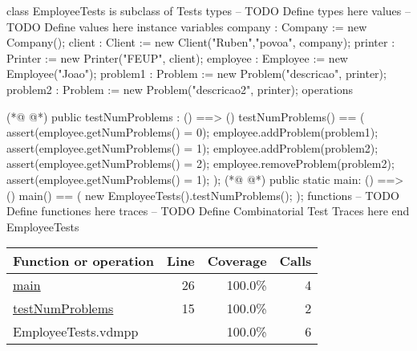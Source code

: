 \begin{vdmpp}[breaklines=true]
class EmployeeTests is subclass of Tests
types
-- TODO Define types here
values
-- TODO Define values here
instance variables
company : Company := new Company();
client : Client := new Client("Ruben","povoa", company);
printer : Printer := new Printer("FEUP", client);
employee : Employee := new Employee("Joao");
problem1 : Problem := new Problem("descricao", printer);
problem2 : Problem := new Problem("descricao2", printer);
operations

(*@
\label{testNumProblems:15}
@*)
public testNumProblems : () ==> ()
testNumProblems() ==
(
assert(employee.getNumProblems() = 0);
employee.addProblem(problem1);
assert(employee.getNumProblems() = 1);
employee.addProblem(problem2);
assert(employee.getNumProblems() = 2);
employee.removeProblem(problem2);
assert(employee.getNumProblems() = 1);
);
(*@
\label{main:26}
@*)
public static main: () ==> ()
 main() ==
 (
  new EmployeeTests().testNumProblems();
 );
functions
-- TODO Define functiones here
traces
-- TODO Define Combinatorial Test Traces here
end EmployeeTests
\end{vdmpp}
\bigskip
\begin{longtable}{|l|r|r|r|}
\hline
Function or operation & Line & Coverage & Calls \\
\hline
\hline
\hyperref[main:26]{main} & 26&100.0\% & 4 \\
\hline
\hyperref[testNumProblems:15]{testNumProblems} & 15&100.0\% & 2 \\
\hline
\hline
EmployeeTests.vdmpp & & 100.0\% & 6 \\
\hline
\end{longtable}

